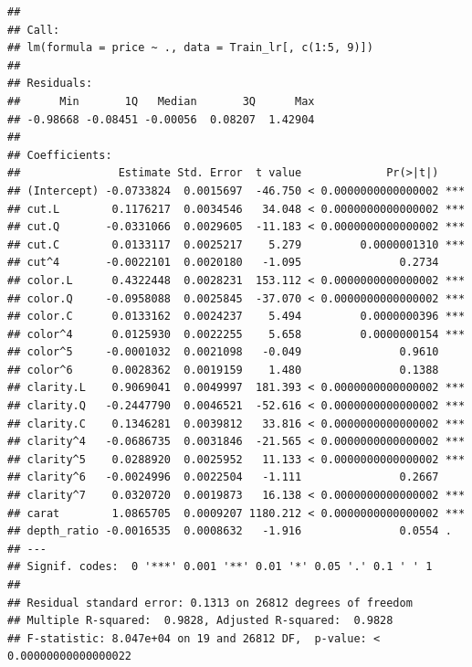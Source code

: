 \documentclass[
]{article}
\begin{document}
\begin{verbatim}
##
## Call:
## lm(formula = price ~ ., data = Train_lr[, c(1:5, 9)])
##
## Residuals:
##      Min       1Q   Median       3Q      Max
## -0.98668 -0.08451 -0.00056  0.08207  1.42904
##
## Coefficients:
##               Estimate Std. Error  t value             Pr(>|t|)
## (Intercept) -0.0733824  0.0015697  -46.750 < 0.0000000000000002 ***
## cut.L        0.1176217  0.0034546   34.048 < 0.0000000000000002 ***
## cut.Q       -0.0331066  0.0029605  -11.183 < 0.0000000000000002 ***
## cut.C        0.0133117  0.0025217    5.279         0.0000001310 ***
## cut^4       -0.0022101  0.0020180   -1.095               0.2734
## color.L      0.4322448  0.0028231  153.112 < 0.0000000000000002 ***
## color.Q     -0.0958088  0.0025845  -37.070 < 0.0000000000000002 ***
## color.C      0.0133162  0.0024237    5.494         0.0000000396 ***
## color^4      0.0125930  0.0022255    5.658         0.0000000154 ***
## color^5     -0.0001032  0.0021098   -0.049               0.9610
## color^6      0.0028362  0.0019159    1.480               0.1388
## clarity.L    0.9069041  0.0049997  181.393 < 0.0000000000000002 ***
## clarity.Q   -0.2447790  0.0046521  -52.616 < 0.0000000000000002 ***
## clarity.C    0.1346281  0.0039812   33.816 < 0.0000000000000002 ***
## clarity^4   -0.0686735  0.0031846  -21.565 < 0.0000000000000002 ***
## clarity^5    0.0288920  0.0025952   11.133 < 0.0000000000000002 ***
## clarity^6   -0.0024996  0.0022504   -1.111               0.2667
## clarity^7    0.0320720  0.0019873   16.138 < 0.0000000000000002 ***
## carat        1.0865705  0.0009207 1180.212 < 0.0000000000000002 ***
## depth_ratio -0.0016535  0.0008632   -1.916               0.0554 .
## ---
## Signif. codes:  0 '***' 0.001 '**' 0.01 '*' 0.05 '.' 0.1 ' ' 1
##
## Residual standard error: 0.1313 on 26812 degrees of freedom
## Multiple R-squared:  0.9828, Adjusted R-squared:  0.9828
## F-statistic: 8.047e+04 on 19 and 26812 DF,  p-value: < 0.00000000000000022
\end{verbatim}
\end{document}
